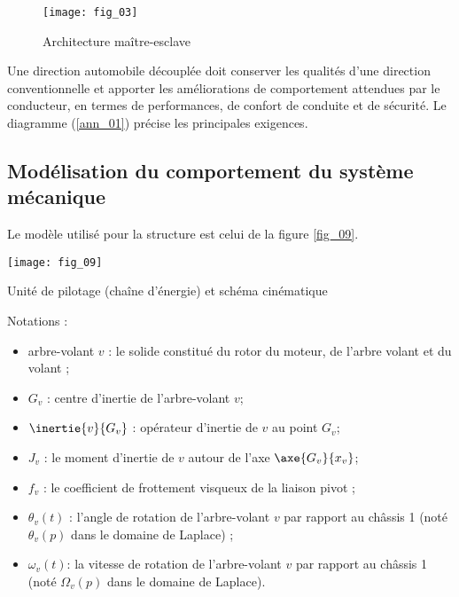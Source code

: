 \begin{figure}[H]
\centering
\texttt{[image: fig\_03]}

\caption{Architecture maître-esclave \label{fig_03}}
\end{figure}



Une direction automobile découplée doit conserver les qualités d'une direction conventionnelle et
apporter les améliorations de comportement attendues par le conducteur, en termes de performances,
de confort de conduite et de sécurité. Le diagramme (\autoref{ann_01}) précise les principales
exigences.

\subsection*{Modélisation du comportement du système mécanique}

Le modèle utilisé pour la structure est celui de la figure \autoref{fig_09}.

\begin{marginfigure}
\centering
\texttt{[image: fig\_09]}
\caption{Unité de pilotage (chaîne d'énergie) et schéma cinématique  \label{fig_09}}
\end{marginfigure}

Notations :
\begin{itemize}
\item arbre-volant $v$ : le solide constitué du rotor du moteur, de l'arbre volant et du volant ;
\item $G_v$ : centre d'inertie de l'arbre-volant $v$;
\item $\inertie{v}{G_v}$ : opérateur d'inertie de $v$ au point $G_v$;
\item $J_v$ : le moment d'inertie de $v$ autour de l'axe $\axe{G_v}{x_v}$;
\item $f_v$ : le coefficient de frottement visqueux de la liaison pivot ;
\item $\theta_v(t)$ : l'angle de rotation de l'arbre-volant $v$ par rapport au châssis 1 (noté $\theta_v(p)$ dans le
domaine de Laplace) ;
\item $\omega_v(t) $: la vitesse de rotation de l'arbre-volant $v$ par rapport au châssis 1 (noté $\Omega_v(p)$ dans le domaine de Laplace).
\end{itemize}

